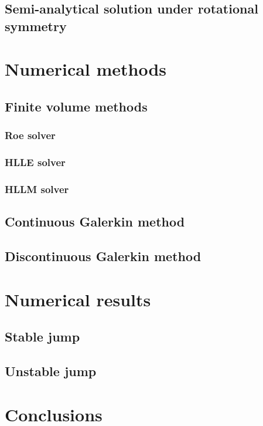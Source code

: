 \documentclass{article}
\begin{document}
\subsection{Semi-analytical solution under rotational symmetry}

\section{Numerical methods}

\subsection{Finite volume methods}

\subsubsection{Roe solver}

\subsubsection{HLLE solver}

\subsubsection{HLLM solver}

\subsection{Continuous Galerkin method}

\subsection{Discontinuous Galerkin method}

\section{Numerical results}

\subsection{Stable jump}

\subsection{Unstable jump}

\section{Conclusions}




\end{document}
